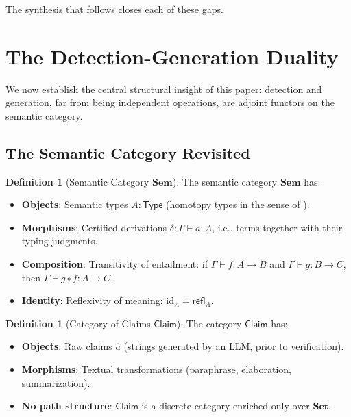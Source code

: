 \documentclass[11pt,a4paper]{article}
\theoremstyle{plain}
\theoremstyle{definition}
\newtheorem{definition}[theorem]{Definition}
\theoremstyle{remark}
\newcommand{\Sem}{\mathbf{Sem}}
\newcommand{\Set}{\mathbf{Set}}
\newcommand{\Type}{\mathsf{Type}}
\newcommand{\refl}{\mathsf{refl}}
\newcommand{\id}{\mathrm{id}}
\begin{document}
The synthesis that follows closes each of these gaps.


\section{The Detection-Generation Duality}\label{sec:duality}

We now establish the central structural insight of this paper: detection and generation, far from being independent operations, are adjoint functors on the semantic category.

\subsection{The Semantic Category Revisited}

\begin{definition}[Semantic Category $\Sem$]\label{def:sem-cat}
The semantic category $\Sem$ has:
\begin{itemize}[nosep]
  \item \textbf{Objects}: Semantic types $A : \Type$ (homotopy types in the sense of ).
  \item \textbf{Morphisms}: Certified derivations $\delta : \Gamma \vdash a : A$, i.e., terms together with their typing judgments.
  \item \textbf{Composition}: Transitivity of entailment: if $\Gamma \vdash f : A \to B$ and $\Gamma \vdash g : B \to C$, then $\Gamma \vdash g \circ f : A \to C$.
  \item \textbf{Identity}: Reflexivity of meaning: $\id_A = \refl_A$.
\end{itemize}
\end{definition}

\begin{definition}[Category of Claims $\mathsf{Claim}$]\label{def:claim-cat}
The category $\mathsf{Claim}$ has:
\begin{itemize}[nosep]
  \item \textbf{Objects}: Raw claims $\hat{a}$ (strings generated by an LLM, prior to verification).
  \item \textbf{Morphisms}: Textual transformations (paraphrase, elaboration, summarization).
  \item \textbf{No path structure}: $\mathsf{Claim}$ is a discrete category enriched only over $\Set$.
\end{itemize}
\end{definition}
\end{document}
